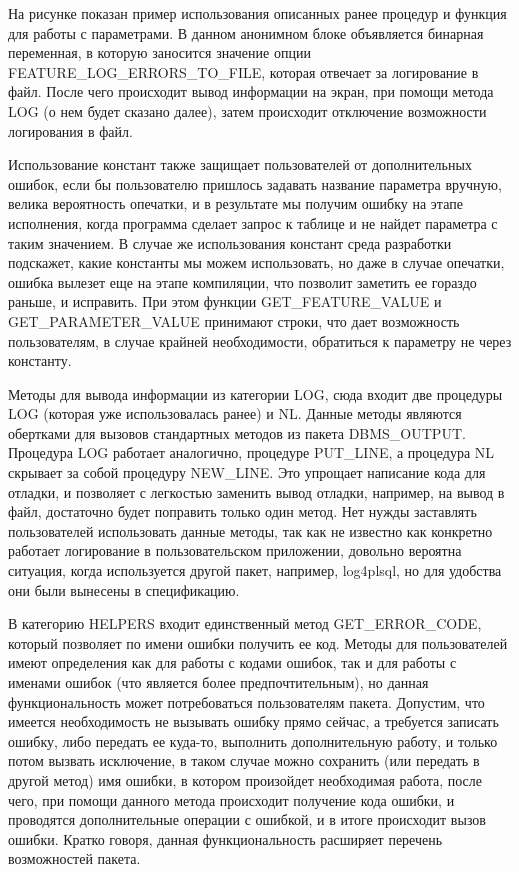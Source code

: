 На рисунке  показан пример использования описанных ранее процедур и функция для работы с параметрами. В данном анонимном блоке объявляется бинарная переменная, в которую заносится значение опции FEATURE\_LOG\_ERRORS\_TO\_FILE, которая отвечает за логирование в файл. После чего происходит вывод информации на экран, при помощи метода LOG (о нем будет сказано далее), затем происходит отключение возможности логирования в файл.

Использование констант также защищает пользователей от дополнительных ошибок, если бы пользователю пришлось задавать название параметра вручную, велика вероятность опечатки, и в результате мы получим ошибку на этапе исполнения, когда программа сделает запрос к таблице и не найдет параметра с таким значением. В случае же использования констант среда разработки подскажет, какие константы мы можем использовать, но даже в случае опечатки, ошибка вылезет еще на этапе компиляции, что позволит заметить ее гораздо раньше, и исправить. При этом функции GET\_FEATURE\_VALUE и GET\_PARAMETER\_VALUE принимают строки, что дает возможность пользователям, в случае крайней необходимости, обратиться к параметру не через константу. 

Методы для вывода информации из категории LOG, сюда входит две процедуры LOG (которая уже использовалась ранее) и NL. Данные методы являются обертками для вызовов стандартных методов из пакета DBMS\_OUTPUT. Процедура LOG работает аналогично, процедуре PUT\_LINE, а процедура NL скрывает за собой процедуру NEW\_LINE. Это упрощает написание кода для отладки, и позволяет с легкостью заменить вывод отладки, например, на вывод в файл, достаточно будет поправить только один метод. Нет нужды заставлять пользователей использовать данные методы, так как не известно как конкретно работает логирование в пользовательском приложении, довольно вероятна ситуация, когда используется другой пакет, например, log4plsql, но для удобства они были вынесены в спецификацию.

В категорию HELPERS входит единственный метод GET\_ERROR\_CODE, который позволяет по имени ошибки получить ее код. Методы для пользователей имеют определения как для работы с кодами ошибок, так и для работы с именами ошибок (что является более предпочтительным), но данная функциональность может потребоваться пользователям пакета. Допустим, что имеется необходимость не вызывать ошибку прямо сейчас, а требуется записать ошибку, либо передать ее куда-то, выполнить дополнительную работу, и только потом вызвать исключение, в таком случае можно сохранить (или передать в другой метод) имя ошибки, в котором произойдет необходимая работа, после чего, при помощи данного метода происходит получение кода ошибки, и проводятся дополнительные операции с ошибкой, и в итоге происходит вызов ошибки. Кратко говоря, данная функциональность расширяет перечень возможностей пакета. 

